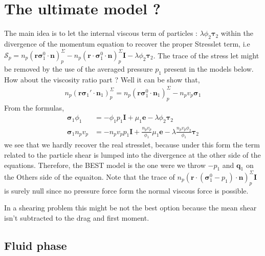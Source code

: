 \section{The ultimate model ?}
The main idea is to let the internal viscous term of particles : $\lambda \phi_2 \bm{\tau}_2$ within the divergence of the momentum equation to recover the proper Stresslet term, i.e $\mathscr{S}_p = n_p(\textbf{r} \bm{\sigma}_1^0 \cdot \textbf{n})_p^\Sigma -n_p(\textbf{r} \cdot \bm{\sigma}_1^0 \cdot \textbf{n})_p^\Sigma \textbf{I} - \lambda \phi_2 \bm{\tau}_2$. 
The trace of the stress let might be removed by the use of the averaged pressure $p_1$ present in the models below. 
How about the viscosity ratio part ? Well it can be show that, 
\begin{align*}
    n_p (\textbf{r} \bm{\sigma}_1'\cdot \textbf{n}_1)_p^\Sigma
    = 
    n_p (\textbf{r} \bm{\sigma}_1^0\cdot \textbf{n}_1)_p^\Sigma
    - n_p v_p \bm{\sigma}_1 
\end{align*}
From the formulas, 
\begin{align*}
    \bm{\sigma}_1 \phi_1
    &=- \phi_1 p_1 \textbf{I}
    + \mu_1 \textbf{e}
    - \lambda \phi_2 \bm{\tau}_2\\
    \bm{\sigma}_1 n_p v_p 
    &=- n_p v_p p_1 \textbf{I}
    + \frac{n_p v_p}{\phi_1}\mu_1 \textbf{e}
    - \lambda \frac{n_pv_p\phi_2}{\phi_1} \bm{\tau}_2
\end{align*}
we see that we hardly recover the real stresslet, because under this form the term related to the particle shear is lumped into the divergence at the other side of the equations. 
Therefore, the BEST model is the one were we throw $-p_1$ and $\textbf{q}_1$ on the Others side of the  equaiton. 
Note that the trace of $n_p(\textbf{r} \cdot (\bm{\sigma}_1^0 - p_1) \cdot \textbf{n})_p^\Sigma \textbf{I}$ is surely null since no pressure force form the normal viscous force is possible. 

In a shearing problem this might be not the best option because the mean shear isn't subtracted to the drag and first moment. 

\subsection*{Fluid phase}

